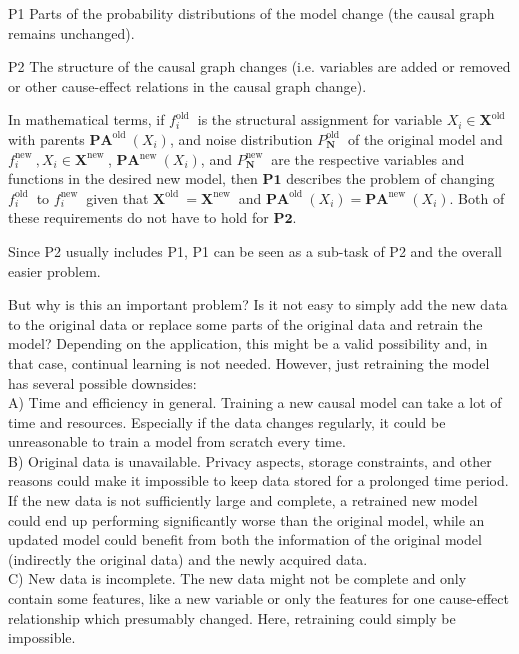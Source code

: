 \documentclass[10pt]{article}
\begin{document}
P1 Parts of the probability distributions of the model change (the causal graph remains unchanged).

P2 The structure of the causal graph changes (i.e. variables are added or removed or other cause-effect relations in the causal graph change).

In mathematical terms, if $f_{i}^{\text {old }}$ is the structural assignment for variable $X_{i} \in \mathbf{X}^{\text {old }}$ with parents $\mathbf{P A}^{\text {old }}\left(X_{i}\right)$, and noise distribution $P_{\mathbf{N}}^{\text {old }}$ of the original model and $f_{i}^{\text {new }}, X_{i} \in \mathbf{X}^{\text {new }}$, $\mathbf{P A}{ }^{\text {new }}\left(X_{i}\right)$, and $P_{\mathbf{N}}^{\text {new }}$ are the respective variables and functions in the desired new model, then $\mathbf{P} \mathbf{1}$ describes the problem of changing $f_{i}^{\text {old }}$ to $f_{i}^{\text {new }}$ given that $\mathbf{X}^{\text {old }}=\mathbf{X}^{\text {new }}$ and $\mathbf{P A}^{\text {old }}\left(X_{i}\right)=\mathbf{P A}^{\text {new }}\left(X_{i}\right)$. Both of these requirements do not have to hold for $\mathbf{P 2}$.

Since P2 usually includes P1, P1 can be seen as a sub-task of P2 and the overall easier problem.

But why is this an important problem? Is it not easy to simply add the new data to the original data or replace some parts of the original data and retrain the model? Depending on the application, this might be a valid possibility and, in that case, continual learning is not needed. However, just retraining the model has several possible downsides:\\
A) Time and efficiency in general. Training a new causal model can take a lot of time and resources. Especially if the data changes regularly, it could be unreasonable to train a model from scratch every time.\\
B) Original data is unavailable. Privacy aspects, storage constraints, and other reasons could make it impossible to keep data stored for a prolonged time period. If the new data is not sufficiently large and complete, a retrained new model could end up performing significantly worse than the original model, while an updated model could benefit from both the information of the original model (indirectly the original data) and the newly acquired data.\\
C) New data is incomplete. The new data might not be complete and only contain some features, like a new variable or only the features for one cause-effect relationship which presumably changed. Here, retraining could simply be impossible.
\end{document}
